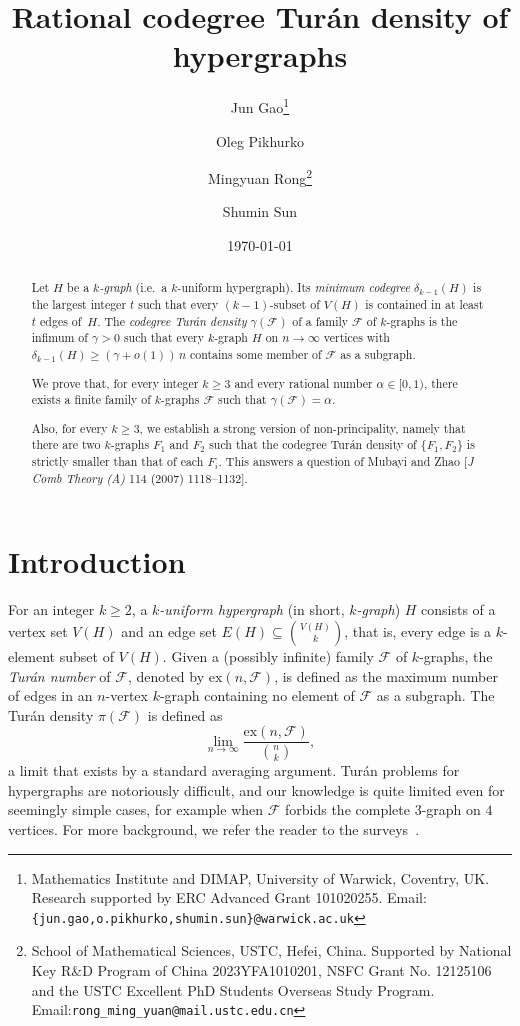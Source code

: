 \documentclass[11pt,a4paper]{article}
\theoremstyle{remark}
\newcommand{\C}[1]{\mathcal{#1}}
\def\ex{\mathrm{ex}}
\begin{document}
%
\title{\bf\Large Rational codegree Tur\'an density of hypergraphs}
%
\date{\today}
\author{Jun Gao\thanks{Mathematics Institute and DIMAP, University of Warwick, Coventry, UK. Research supported by ERC Advanced Grant 101020255. Email: \texttt{\{jun.gao,o.pikhurko,shumin.sun\}@warwick.ac.uk}}
\and Oleg Pikhurko\footnotemark[1] 
\and Mingyuan Rong\thanks{School of Mathematical Sciences, USTC, Hefei, China. Supported by National Key R\&D Program of China 2023YFA1010201, NSFC Grant No. 12125106 and the USTC Excellent PhD Students Overseas Study Program. Email:\texttt{rong\_ming\_yuan@mail.ustc.edu.cn}}
\and Shumin Sun\footnotemark[1]}

\maketitle
\begin{abstract}
Let $H$ be a \emph{$k$-graph} (i.e.\ a $k$-uniform hypergraph). Its \emph{minimum
codegree} $\delta_{k-1}(H)$ is the largest integer $t$ such that every
$(k-1)$-subset of $V(H)$ is contained in at least $t$ edges of~$H$.
The \emph{codegree
Turán density} $\gamma(\mathcal{F})$ of a family $\mathcal{F}$ of $k$-graphs is the infimum of $\gamma > 0$ such
that every $k$-graph $H$ on $n\to\infty$ vertices with $\delta_{k-1}(H) \ge (\gamma+o(1))\, n$
contains some member of $\mathcal{F}$ as a subgraph.


We prove that, for every integer $k\ge3$ and every rational number $\alpha \in [0,1)$,
there exists a finite family of $k$-graphs $\mathcal{F}$ such that $\gamma(\mathcal{F})=\alpha$. 

Also, for every $k \ge 3$, we establish a strong version of non-principality, namely that there are two $k$-graphs $F_1$ and $F_2$ such that the codegree Tur\'an density of $\{F_1,F_2\}$ is strictly smaller than that of each $F_i$.
This answers a question of Mubayi and Zhao [\emph{J Comb Theory (A)} 114 (2007) 1118--1132].

\end{abstract}

\section{Introduction}
For an integer $k\geq 2$, a \textit{$k$-uniform hypergraph} (in short, \textit{$k$-graph}) $H$ consists of a vertex set $V(H)$ and an edge set $E(H)\subseteq \binom{V(H)}{k}$, that is, every edge is a $k$-element subset of $V(H)$.  Given a (possibly infinite) family $\C F$ of $k$-graphs, the \emph{Tur\'an number} of $\C F$, denoted by $\ex(n,\C F)$, is defined as the maximum number of edges in an $n$-vertex $k$-graph containing no element of $\C F$ as a subgraph. The Tur\'an density $\pi(\C F)$ is defined as
\[
\lim_{n\to \infty}\frac{\ex(n,\C F)}{\binom{n}{k}},
\]
a limit that exists by a standard averaging argument. Tur\'an problems for hypergraphs are notoriously difficult, and our knowledge is quite limited even for seemingly simple cases, for example when $\C F$ forbids the complete $3$-graph on $4$ vertices. For more background, we refer the reader to the surveys~\cite{kee11,sido95}.
\end{document}
